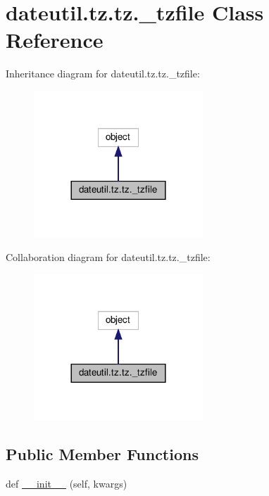 \hypertarget{classdateutil_1_1tz_1_1tz_1_1__tzfile}{}\section{dateutil.\+tz.\+tz.\+\_\+tzfile Class Reference}
\label{classdateutil_1_1tz_1_1tz_1_1__tzfile}


Inheritance diagram for dateutil.\+tz.\+tz.\+\_\+tzfile\+:
\nopagebreak
\begin{figure}[H]
\begin{center}
\leavevmode
\includegraphics[width=180pt]{classdateutil_1_1tz_1_1tz_1_1__tzfile__inherit__graph}
\end{center}
\end{figure}


Collaboration diagram for dateutil.\+tz.\+tz.\+\_\+tzfile\+:
\nopagebreak
\begin{figure}[H]
\begin{center}
\leavevmode
\includegraphics[width=180pt]{classdateutil_1_1tz_1_1tz_1_1__tzfile__coll__graph}
\end{center}
\end{figure}
\subsection*{Public Member Functions}
\begin{DoxyCompactItemize}
\item 
def \hyperlink{classdateutil_1_1tz_1_1tz_1_1__tzfile_ad940c6ee393611d013bba58074716b1d}{\+\_\+\+\_\+init\+\_\+\+\_\+} (self, kwargs)
\end{DoxyCompactItemize}
